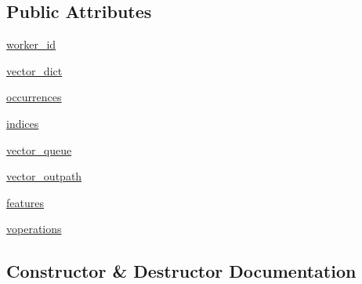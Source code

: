 \subsection*{Public Attributes}
\begin{DoxyCompactItemize}
\item 
\hyperlink{classsrc_1_1mapping_1_1mapthreading_1_1_mapping_worker_thread_a31a9d651719e7dc0c3c0655885b057f1}{worker\+\_\+id}
\item 
\hyperlink{classsrc_1_1mapping_1_1mapthreading_1_1_mapping_worker_thread_a3b681382a138a5eee92f956792f96445}{vector\+\_\+dict}
\item 
\hyperlink{classsrc_1_1mapping_1_1mapthreading_1_1_mapping_worker_thread_a8d87ef19617f8a43ff093a075ddc6f57}{occurrences}
\item 
\hyperlink{classsrc_1_1mapping_1_1mapthreading_1_1_mapping_worker_thread_ae26274456128e01544339e9ec7c4eefb}{indices}
\item 
\hyperlink{classsrc_1_1mapping_1_1mapthreading_1_1_mapping_worker_thread_a64f7aadd3ef3abd74551927eaddad44c}{vector\+\_\+queue}
\item 
\hyperlink{classsrc_1_1mapping_1_1mapthreading_1_1_mapping_worker_thread_a9ee70fb431a73f6600fa8d9fcfbb1789}{vector\+\_\+outpath}
\item 
\hyperlink{classsrc_1_1mapping_1_1mapthreading_1_1_mapping_worker_thread_aef3a19d93efa561529cd8c119dd64e8d}{features}
\item 
\hyperlink{classsrc_1_1mapping_1_1mapthreading_1_1_mapping_worker_thread_aef1aaaa9dcac3a85778d52927abfd640}{voperations}
\end{DoxyCompactItemize}


\subsection{Constructor \& Destructor Documentation}
